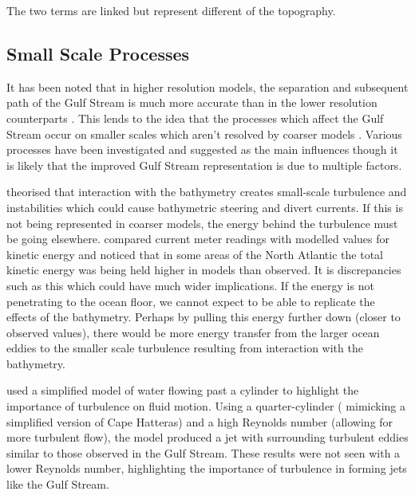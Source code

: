 \documentclass[..\EOYR.tex]{subfiles}
\begin{document}
The two terms are linked but represent different  of the topography.






\subsection{Small Scale Processes}

It has been noted that in higher resolution models, the separation and subsequent path of the Gulf Stream is much more accurate than in the lower resolution counterparts \citep{Hurlburt2008}\citep{Zhang2007}. This lends to the idea that the processes which affect the Gulf Stream occur on smaller scales which aren't resolved by coarser models \citep{NaveiraGarabato2013}\citep{Nikurashin2012a}. Various processes have been investigated and suggested as the main influences though it is likely that the improved Gulf Stream representation is due to multiple factors.


\citep{NaveiraGarabato2013} theorised that interaction with the bathymetry creates small-scale turbulence and instabilities which could cause bathymetric steering and divert currents. If this is not being represented in coarser models, the energy behind the turbulence must be going elsewhere. \citep{Scott2010} compared current meter readings with modelled values for kinetic energy and noticed that in some areas of the North Atlantic the total kinetic energy was being held higher in models than observed. It is discrepancies such as this which could have much wider implications. If the energy is not penetrating to the ocean floor, we cannot expect to be able to replicate the effects of the bathymetry. Perhaps by pulling this energy further down (closer to observed values), there would be more energy transfer from the larger ocean eddies to the smaller scale turbulence resulting from interaction with the bathymetry.

\citep{Tansley2001} used a simplified model of water flowing past a cylinder to highlight the importance of turbulence on fluid motion. Using a quarter-cylinder ( mimicking a simplified version of Cape Hatteras) and a high Reynolds number (allowing for more turbulent flow), the model produced a jet with surrounding turbulent eddies similar to those observed in the Gulf Stream. These results were not seen with a lower Reynolds number, highlighting the importance of turbulence in forming jets like the Gulf Stream.
\end{document}
